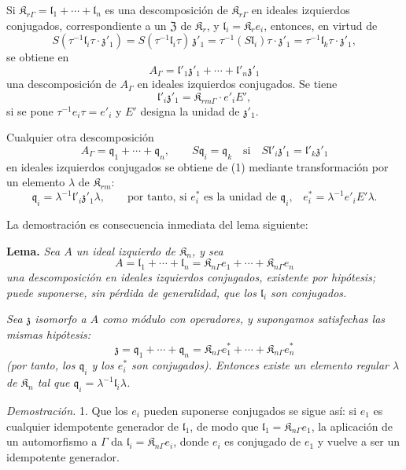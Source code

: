 Si \(\mathfrak K_{r\Gamma}=\mathfrak l_1+\cdots+\mathfrak l_n\) es una descomposición de \(\mathfrak K_{r\Gamma}\) en ideales izquierdos conjugados, correspondiente a un \(\mathfrak Z\) de \(\mathfrak K_r\), y \(\mathfrak l_i=\mathfrak K_r e_i\), entonces, en virtud de
\[
S(\tau^{-1}\mathfrak l_i\tau\cdot\mathfrak z'_1)
=S(\tau^{-1}\mathfrak l_i\tau)\,\mathfrak z'_1
=\tau^{-1}(S\mathfrak l_i)\tau\cdot\mathfrak z'_1
=\tau^{-1}\mathfrak l_k\tau\cdot\mathfrak z'_1,
\]
se obtiene en
\[
\tag{1}
A_\Gamma=\mathfrak l'_1\mathfrak z'_1+\cdots+\mathfrak l'_n\mathfrak z'_1
\]
una descomposición de \(A_\Gamma\) en ideales izquierdos conjugados. Se tiene
\[
\mathfrak l'_i\mathfrak z'_1=\mathfrak K_{rm\Gamma}\cdot e'_iE',
\]
si se pone \(\tau^{-1}e_i\tau=e'_i\) y \(E'\) designa la unidad de \(\mathfrak z'_1\).

Cualquier otra descomposición
\[
\tag{2}
A_\Gamma=\mathfrak q_1+\cdots+\mathfrak q_n,\qquad
S\mathfrak q_i=\mathfrak q_k\quad\text{si}\quad
S\mathfrak l'_i\mathfrak z'_1=\mathfrak l'_k\mathfrak z'_1
\]
en ideales izquierdos conjugados se obtiene de (1) mediante transformación por un elemento \(\lambda\) de \(\mathfrak K_{rm}\):
\[
\mathfrak q_i=\lambda^{-1}\mathfrak l'_i\mathfrak z'_1\lambda,
\qquad
\text{por tanto, si \(e_i^*\) es la unidad de \(\mathfrak q_i\),}\quad
e_i^*=\lambda^{-1}e'_iE'\lambda.
\]

La demostración es consecuencia inmediata del lema siguiente:

\textbf{Lema.} \emph{Sea \(A\) un ideal izquierdo de \(\mathfrak K_n\), y sea}
\[
A=\mathfrak l_1+\cdots+\mathfrak l_n
=\mathfrak K_{n\Gamma}e_1+\cdots+\mathfrak K_{n\Gamma}e_n
\]
\emph{una descomposición en ideales izquierdos conjugados, existente por hipótesis; puede suponerse, sin pérdida de generalidad, que los \(\mathfrak l_i\) son conjugados.}

\emph{Sea \(\mathfrak z\) isomorfo a \(A\) como módulo con operadores, y supongamos satisfechas las mismas hipótesis:}
\[
\mathfrak z=\mathfrak q_1+\cdots+\mathfrak q_n
=\mathfrak K_{n\Gamma}e_1^*+\cdots+\mathfrak K_{n\Gamma}e_n^*
\]
\emph{(por tanto, los \(\mathfrak q_i\) y los \(e_i^*\) son conjugados). Entonces existe un elemento regular \(\lambda\) de \(\mathfrak K_n\) tal que \(\mathfrak q_i=\lambda^{-1}\mathfrak l_i\lambda\).}

\emph{Demostración.} 1. Que los \(e_i\) pueden suponerse conjugados se sigue así: si \(e_1\) es cualquier idempotente generador de \(\mathfrak l_1\), de modo que \(\mathfrak l_1=\mathfrak K_{n\Gamma}e_1\), la aplicación de un automorfismo a \(\Gamma\) da \(\mathfrak l_i=\mathfrak K_{n\Gamma}e_i\), donde \(e_i\) es conjugado de \(e_1\) y vuelve a ser un idempotente generador.

